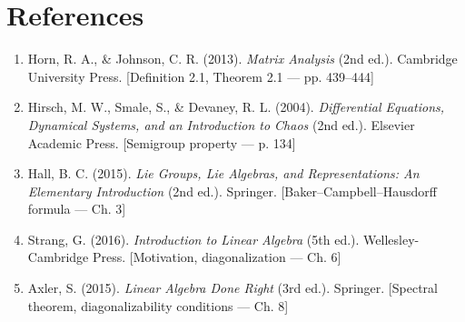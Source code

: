 \documentclass[11pt,a4paper]{article}
\begin{document}
\section{References}
\begin{enumerate}
    \item Horn, R. A., \& Johnson, C. R. (2013). \textit{Matrix Analysis} (2nd ed.). Cambridge University Press. [Definition 2.1, Theorem 2.1 — pp. 439–444]
    \item Hirsch, M. W., Smale, S., \& Devaney, R. L. (2004). \textit{Differential Equations, Dynamical Systems, and an Introduction to Chaos} (2nd ed.). Elsevier Academic Press. [Semigroup property — p. 134]
    \item Hall, B. C. (2015). \textit{Lie Groups, Lie Algebras, and Representations: An Elementary Introduction} (2nd ed.). Springer. [Baker–Campbell–Hausdorff formula — Ch. 3]
    \item Strang, G. (2016). \textit{Introduction to Linear Algebra} (5th ed.). Wellesley-Cambridge Press. [Motivation, diagonalization — Ch. 6]
    \item Axler, S. (2015). \textit{Linear Algebra Done Right} (3rd ed.). Springer. [Spectral theorem, diagonalizability conditions — Ch. 8]
\end{enumerate}
\end{document}
